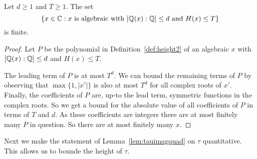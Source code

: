 \begin{theorem}
  \label{thm:northcott}
  Let $d\ge 1$ and $T\ge 1$. The set
  \begin{equation*}
    \{x\in {\mathbb{C}} : x \text{ is algebraic with }[{\mathbb{Q}}(x):{\mathbb{Q}}]\le d\text{
      and }H(x)\le T\}
  \end{equation*}
  is finite. 
\end{theorem}
\begin{proof}
  Let $P$ be the polynomial in Definition~\ref{def:height2} of an
  algebraic $x$ with $[{\mathbb{Q}}(x):{\mathbb{Q}}]\le d$ and $H(x)\le T$.

  The leading term of $P$ is at most $T^d$. We can bound the remaining
  terms of $P$ by observing that $\max\{1,|x'|\}$
  is also at most $T^d$ for all complex roots of $x'$.
  Finally, the coefficients of $P$ are, up-to the lead term, symmetric
  functions in the complex roots. So we get a bound for the absolute
  value of all coefficients of $P$ in terms of $T$ and $d$. As these
  coefficients are integers there are at most finitely many $P$ in
  question. So there are at most finitely many $x$. 
\end{proof}

Next we make the statement of Lemma~\ref{lem:tauimagquad} on $\tau$
quantitative. This allows us to bounde the height of $\tau$.

